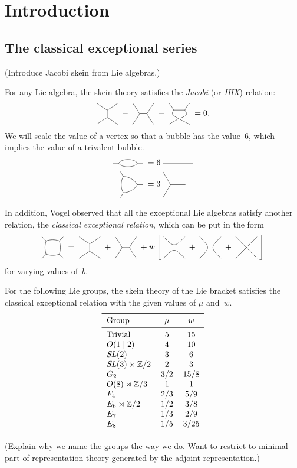 \documentclass[12pt]{amsart}
\begin{document}
\section{Introduction}
\label{sec:introduction}

\subsection{The classical exceptional series}
\label{sec:classical-except}

(Introduce Jacobi skein from Lie algebras.)

For any Lie algebra, the skein theory satisfies the \emph{Jacobi} (or \emph{IHX})
relation:
\begin{equation}
\drawI\; - \;\drawH\; + \;\drawcrossX\; = 0.
\label{eq:IHX}
\end{equation}
We will scale the value of a vertex so that a bubble has the
value~$6$, which implies the value of a trivalent bubble.
\begin{align*}
\ngon{2}\; &= 6\;\onestrandid \\
  \ngon{3}\; &= 3\;\nvertex{3}
\end{align*}

In addition, Vogel observed that all the exceptional Lie algebras
satisfy another relation, the \emph{classical exceptional relation},
which can be put in the form
\begin{equation}
\ngon[45]{4}\; = \;\drawI\; + \;\drawH\;
 + w \left[ \;\twostrandid\; + \;\cupcap\; + \;\symcross\; \right]
\label{eq:classical-except}
\end{equation}
for varying values of~$b$.

\begin{theorem}[Vogel]
  For the following Lie groups, the skein theory of the Lie bracket
  satisfies the classical exceptional relation with the given values
  of $\mu$ and~$w$.
  \[
  \begin{tabular}{lcc}
    \toprule
    Group         & $\mu$ & $w$\\
    \midrule
    Trivial             & $5$ & $15$ \\
    $O(1 \mid 2)$       & $4$ & $10$ \\
    $\SL(2)$            & $3$ & $6$ \\
    $\SL(3)\rtimes\ZZ/2$& $2$ & $3$ \\
    $G_2$              & $3/2$ & $15/8$ \\
    $O(8)\rtimes\ZZ/3$  & $1$ & $1$\\
    $F_4$               & $2/3$ & $5/9$\\
    $E_6\rtimes\ZZ/2$   & $1/2$ & $3/8$\\
    $E_7$               & $1/3$ & $2/9$ \\
    $E_8$               & $1/5$ & $3/25$ \\
    \bottomrule
  \end{tabular}
  \]
\end{theorem}
(Explain why we name the groups the way we do. Want to restrict to
minimal part of representation theory generated by the adjoint
representation.)
\end{document}
